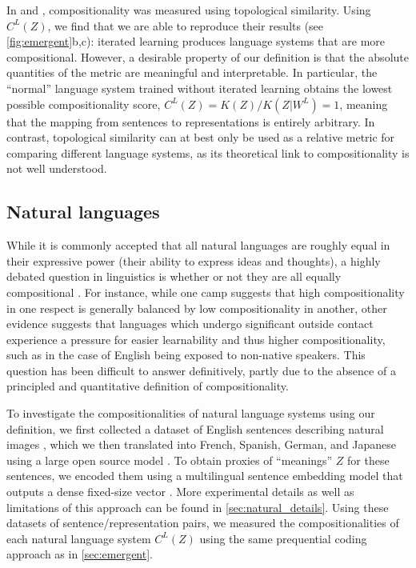 \documentclass{article}
\begin{document}
In \citet{li2019ease} and \citet{ren2020compositional}, compositionality was measured using topological similarity. Using $C^L(Z)$, we find that we are able to reproduce their results (see \cref{fig:emergent}b,c): iterated learning produces language systems that are more compositional. However, a desirable property of our definition is that the absolute quantities of the metric are meaningful and interpretable. In particular, the ``normal'' language system trained without iterated learning obtains the lowest possible compositionality score, $C^L(Z) = K(Z) / K(Z|W^L) = 1$, meaning that the mapping from sentences to representations is entirely arbitrary. In contrast, topological similarity can at best only be used as a relative metric for comparing different language systems, as its theoretical link to compositionality is not well understood.


\subsection{Natural languages}
\label{sec:natural}

While it is commonly accepted that all natural languages are roughly equal in their expressive power (their ability to express ideas and thoughts), a highly debated question in linguistics is whether or not they are all equally compositional \citep{joseph2012all}. For instance, while one camp suggests that high compositionality in one respect is generally balanced by low compositionality in another, other evidence suggests that languages which undergo significant outside contact experience a pressure for easier learnability and thus higher compositionality, such as in the case of English being exposed to non-native speakers. This question has been difficult to answer definitively, partly due to the absence of a principled and quantitative definition of compositionality.

To investigate the compositionalities of natural language systems using our definition, we first collected a dataset of English sentences describing natural images \citep{coco-captions}, which we then translated into French, Spanish, German, and Japanese using a large open source model \citep{costa2022no}. To obtain proxies of ``meanings'' $Z$ for these sentences, we encoded them using a multilingual sentence embedding model that outputs a dense fixed-size vector \citep{reimers-2020-multilingual-sentence-bert}. More experimental details as well as limitations of this approach can be found in \cref{sec:natural_details}. 
Using these datasets of sentence/representation pairs, we measured the compositionalities of each natural language system $C^L(Z)$ using the same prequential coding approach as in \cref{sec:emergent}.
\end{document}
